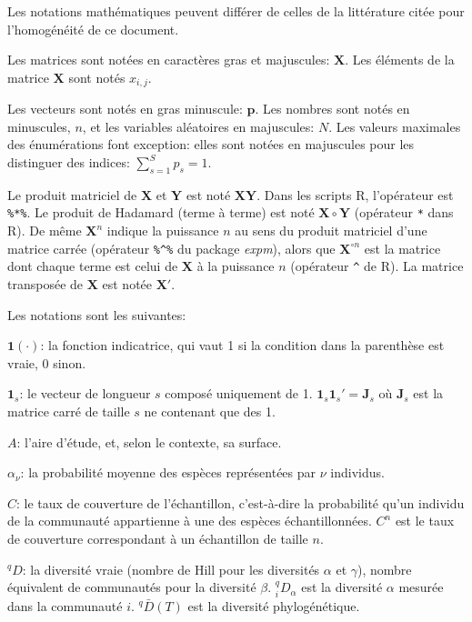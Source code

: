 \documentclass[
  11pt,
  french,
  a4paper,
  extrafontsizes,onecolumn,openright
  ]{memoir}
\newlength{\rf}
\begin{document}
Les notations mathématiques peuvent différer de celles de la littérature citée pour l'homogénéité de ce document.

Les matrices sont notées en caractères gras et majuscules: \(\mathbf{X}\).
Les éléments de la matrice \(\mathbf{X}\) sont notés \(x_{i,j}\).

Les vecteurs sont notés en gras minuscule: \(\mathbf{p}\).
Les nombres sont notés en minuscules, \(n\), et les variables aléatoires en majuscules: \(N\).
Les valeurs maximales des énumérations font exception: elles sont notées en majuscules pour les distinguer des indices: \(\sum_{s=1}^{S}{p_s}=1\).

Le produit matriciel de \(\mathbf{X}\) et \(\mathbf{Y}\) est noté \(\mathbf{X}\mathbf{Y}\). Dans les scripts R, l'opérateur est \texttt{\%*\%}.
Le produit de Hadamard (terme à terme) est noté \(\mathbf{X}\circ\mathbf{Y}\) (opérateur \texttt{*} dans R).
De même \(\mathbf{X}^n\) indique la puissance \(n\) au sens du produit matriciel d'une matrice carrée (opérateur \texttt{\%\^{}\%} du package \emph{expm}), alors que \(\mathbf{X}^{\circ n}\) est la matrice dont chaque terme est celui de \(\mathbf{X}\) à la puissance \(n\) (opérateur \texttt{\^{}} de R).
La matrice transposée de \(\mathbf{X}\) est notée \(\mathbf{X'}\).

Les notations sont les suivantes:

\noindent \({\mathbf 1}(\cdot)\): la fonction indicatrice, qui vaut 1 si la condition dans la parenthèse est vraie, 0 sinon.

\noindent \(\mathbf{1}_s\): le vecteur de longueur \(s\) composé uniquement de 1. \(\mathbf{1}_s\mathbf{1}_s'=\mathbf{J}_s\) où \(\mathbf{J}_s\) est la matrice carré de taille \(s\) ne contenant que des 1.

\noindent \(A\): l'aire d'étude, et, selon le contexte, sa surface.

\noindent \(\alpha_\nu\): la probabilité moyenne des espèces représentées par \(\nu\) individus.

\noindent \(C\): le taux de couverture de l'échantillon, c'est-à-dire la probabilité qu'un individu de la communauté appartienne à une des espèces échantillonnées.
\(C^{n}\) est le taux de couverture correspondant à un échantillon de taille \(n\).

\noindent \(^{q}\!D\): la diversité vraie (nombre de Hill pour les diversités \(\alpha\) et \(\gamma\)), nombre équivalent de communautés pour la diversité \(\beta\).
\(^{q}_{i}\!D_{\alpha}\) est la diversité \(\alpha\) mesurée dans la communauté \(i\).
\(^{q}\!\bar{D}\left(T\right)\) est la diversité phylogénétique.
\end{document}
